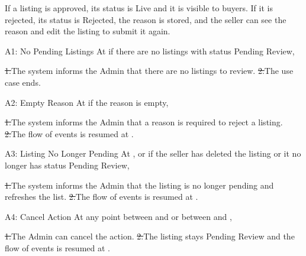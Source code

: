 If a listing is approved, its status is Live and it is visible to buyers. If it is rejected, its status is Rejected, the reason is stored, and the seller can see the reason and edit the listing to submit it again.\par
{}
\begin{flowblock}{A1: No Pending Listings}
At  if there are no listings with status Pending Review,\par
\st{1.}{The system informs the Admin that there are no listings to review.}
\st{2.}{The use case ends.}
\end{flowblock}
\begin{flowblock}{A2: Empty Reason}
At  if the reason is empty,\par
\st{1.}{The system informs the Admin that a reason is required to reject a listing.}
\st{2.}{The flow of events is resumed at .}
\end{flowblock}
\begin{flowblock}{A3: Listing No Longer Pending}
At ,  or  if the seller has deleted the listing or it no longer has status Pending Review,\par
\st{1.}{The system informs the Admin that the listing is no longer pending and refreshes the list.}
\st{2.}{The flow of events is resumed at .}
\end{flowblock}
\begin{flowblock}{A4: Cancel Action}
At any point between  and  or between  and ,\par
\st{1.}{The Admin can cancel the action.}
\st{2.}{The listing stays Pending Review and the flow of events is resumed at .}
\end{flowblock}

